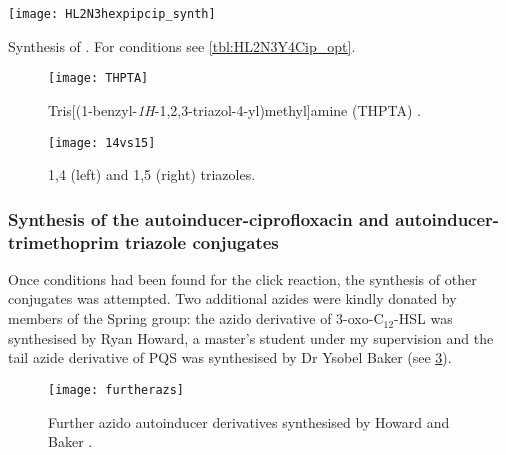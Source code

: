 \begin{scheme}[H]
	\begin{center}
		\texttt{[image: HL2N3hexpipcip\_synth]}
		\caption{Synthesis of . For conditions see \ref{tbl:HL2N3Y4Cip_opt}. \label{sch:HL2N3Y4Cip_synth}}
	\end{center}
\end{scheme}


\begin{figure}[H]
	\begin{center}
		\texttt{[image: THPTA]}
		\caption{Tris[(1-benzyl-\textit{1H}-1,2,3-triazol-4-yl)methyl]amine (THPTA)  .\label{fig:THPTA}}
	\end{center}
\end{figure}

\begin{figure}[H]
	\begin{center}
		\texttt{[image: 14vs15]}
		\caption{1,4 (left) and 1,5 (right) triazoles.\label{fig:14vs15}}
	\end{center}
\end{figure}

\subsubsection{Synthesis of the autoinducer-ciprofloxacin and autoinducer-trimethoprim triazole conjugates}

Once conditions had been found for the click reaction, the synthesis of other conjugates was attempted. 
Two additional azides were kindly donated by members of the Spring group: 
the azido derivative of 3-oxo-C$_{12}$-HSL  was synthesised by Ryan Howard, a master's student under my supervision\cite{Howard2015} and
the tail azide derivative of PQS  was synthesised by Dr Ysobel Baker\cite{Baker2015} (see \ref{fig:furtherazs}).

\begin{figure}[H]
	\begin{center}
		\texttt{[image: furtherazs]}
		\caption{Further azido autoinducer derivatives synthesised by Howard\cite{Howard2015}  and Baker\cite{Baker2015} .\label{fig:furtherazs}} 
	\end{center}
\end{figure}

